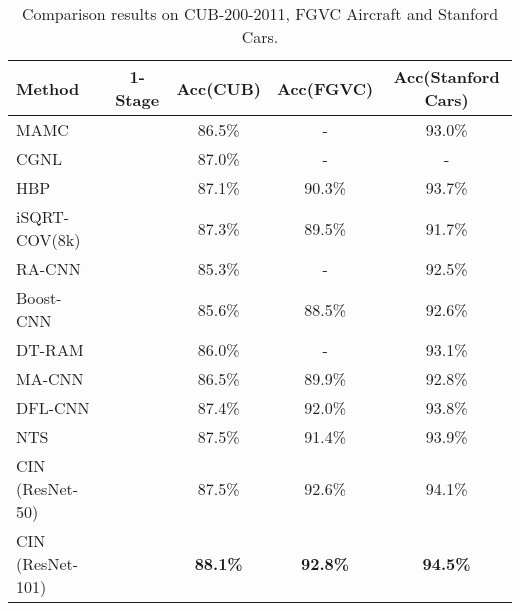 \documentclass[letterpaper]{article} \usepackage{aaai20}  \usepackage{times}  \usepackage{helvet} \usepackage{courier}  \usepackage[hyphens]{url}  \usepackage{graphicx} \urlstyle{rm} \def\UrlFont{\rm}  \usepackage{graphicx}  \frenchspacing  \setlength{\pdfpagewidth}{8.5in}  \setlength{\pdfpageheight}{11in}  \usepackage{amsmath,amssymb}
\begin{document}
\begin{table*}[t]
\begin{center}
\begin{tabular}{|l|c|c|c|c|}
\hline
Method  & 1-Stage & Acc(CUB)  & Acc(FGVC) & Acc(Stanford Cars)\\
\hline\hline
MAMC~\cite{DBLP:conf/eccv/SunYZD18} &  & 86.5\% & - & 93.0\%\\
CGNL~\cite{yu2018hierarchical}  &  & 87.0\%& - & - \\
HBP~\cite{yu2018hierarchical}  &  & 87.1\%& 90.3\% & 93.7\%\\
iSQRT-COV(8k)~\cite{DBLP:conf/cvpr/LiXWG18} &  & 87.3\% & 89.5\% & 91.7\%\\
RA-CNN~\cite{fu2017look}  &  & 85.3\% & - & 92.5\%\\
Boost-CNN~\cite{DBLP:conf/bmvc/MoghimiBSYVL16}  &  & 85.6\% & 88.5\% & 92.6\%\\
DT-RAM~\cite{li2017dynamic} &  & 86.0\% & - & 93.1\%\\
MA-CNN~\cite{zheng2017learning}&  & 86.5\% & 89.9\% & 92.8\%\\
DFL-CNN~\cite{wang2018learning} &  & 87.4\% & 92.0\% & 93.8\%\\
NTS~\cite{yang2018learning} &  & 87.5\% & 91.4\% & 93.9\%\\
\hline
CIN (ResNet-50) &  & 87.5\% & 92.6\% & 94.1\%\\
CIN (ResNet-101) &  & \textbf{88.1\%} & \textbf{92.8\%}& \textbf{94.5\%}\\
\hline
\end{tabular}
\end{center}
\caption{Comparison results on CUB-200-2011, FGVC Aircraft and Stanford Cars.}
\label{tab:cub}
\end{table*}
\end{document}
